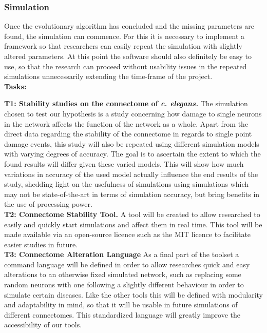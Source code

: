 \documentclass[a4paper,11pt]{article}
\begin{document}
\subsubsection{Simulation}
Once the evolutionary algorithm has concluded and the missing parameters are found, the simulation can commence. For this it is necessary to implement a framework so that researchers can easily repeat the simulation with slightly altered parameters. At this point the software should also definitely be easy to use, so that the research can proceed without usability issues in the repeated simulations unnecessarily extending the time-frame of the project.
\\[0,2cm]

\textbf{Tasks:}

\textbf{T1: Stability studies on the connectome of \emph{c. elegans.}}
The simulation chosen to test our hypothesis is a study concerning how damage to single neurons in the network affects the function of the network as a whole.
Apart from the direct data regarding the stability of the connectome in regards to single point damage events, this study will also be repeated using different simulation models with varying degrees of accuracy. The goal is to ascertain the extent to which the found results will differ given these varied models. This will show how much variations in accuracy of the used model actually influence the end results of the study, shedding light on the usefulness of simulations using simulations which may not be state-of-the-art in terms of simulation accuracy, but bring benefits in the use of processing power. 
\\[0,2cm]

\textbf{T2: Connectome Stability Tool.}
A tool will be created to allow researched to easily and quickly start simulations and affect them in real time. This tool will be made available via an open-source licence such as the MIT licence to facilitate easier studies in future. 
\\[0,2cm]

\textbf{T3: Connectome Alteration Language}
As a final part of the toolset a command language will be defined in order to allow researches quick and easy alterations to an otherwise fixed simulated network, such as replacing some random neurons with one following a slightly different behaviour in order to simulate certain diseases. Like the other tools this will be defined with modularity and adaptability in mind, so that it will be usable in future simulations of different connectomes. This standardized language will greatly improve the accessibility of our tools.
\\[0,2cm]
\end{document}

